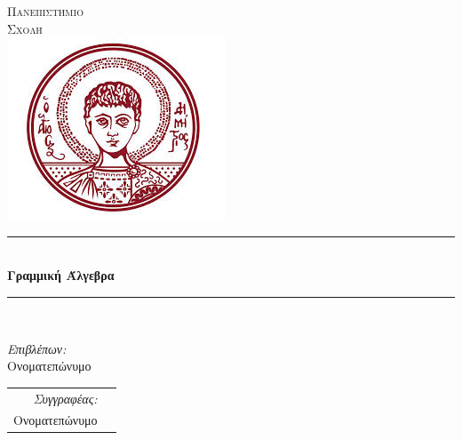 \begin{titlepage}

\pagestyle{empty}
\title{}
\author{Όνομα}
\date{\today}

\newcommand{\HRule}{\rule{\linewidth}{0.5mm}} %

\begin{center}
 

\textsc{Πανεπιστήμιο}\\[1cm]
\textsc{Σχολή}\\[3.5cm] 

\includegraphics[scale=0.8]{figures/authsymbol.png}\\ %


\HRule \\[0.4cm]
{\Large \bfseries Γραμμική Άλγεβρα}\\[0.4cm] %
\HRule \\[1.5cm]
 
\end{center}

\noindent
\begin{minipage}[t]{.49\textwidth}
\raggedright
\large
\emph{Επιβλέπων:}\\
Ονοματεπώνυμο
\end{minipage}%
%
\hfill
%
\begin{minipage}[t]{.49\textwidth}
\raggedleft
\begin{tabular}[t]{@{} r l @{}}
\large
\emph{Συγγραφέας:}\\
\large
Ονοματεπώνυμο
\end{tabular}
\end{minipage}\\
\end{titlepage}
